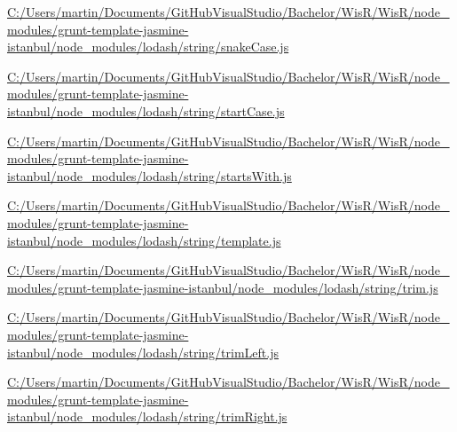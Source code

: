 \begin{DoxyCompactItemize}
\item 
\hyperlink{_c_1_2_users_2martin_2_documents_2_git_hub_visual_studio_2_bachelor_2_wis_r_2_wis_r_2node_moduleecd1498d65801c0d5530f57e7e5652d8}{C\+:/\+Users/martin/\+Documents/\+Git\+Hub\+Visual\+Studio/\+Bachelor/\+Wis\+R/\+Wis\+R/node\+\_\+modules/grunt-\/template-\/jasmine-\/istanbul/node\+\_\+modules/lodash/string/snake\+Case.\+js}
\item 
\hyperlink{_c_1_2_users_2martin_2_documents_2_git_hub_visual_studio_2_bachelor_2_wis_r_2_wis_r_2node_moduleed6e7930574a8e05fc16a488094f4093}{C\+:/\+Users/martin/\+Documents/\+Git\+Hub\+Visual\+Studio/\+Bachelor/\+Wis\+R/\+Wis\+R/node\+\_\+modules/grunt-\/template-\/jasmine-\/istanbul/node\+\_\+modules/lodash/string/start\+Case.\+js}
\item 
\hyperlink{_c_1_2_users_2martin_2_documents_2_git_hub_visual_studio_2_bachelor_2_wis_r_2_wis_r_2node_modulef7b64fa5ac90e24cb7efebb11f6658e1}{C\+:/\+Users/martin/\+Documents/\+Git\+Hub\+Visual\+Studio/\+Bachelor/\+Wis\+R/\+Wis\+R/node\+\_\+modules/grunt-\/template-\/jasmine-\/istanbul/node\+\_\+modules/lodash/string/starts\+With.\+js}
\item 
\hyperlink{_c_1_2_users_2martin_2_documents_2_git_hub_visual_studio_2_bachelor_2_wis_r_2_wis_r_2node_moduleccdd05b6c4baa7b5de77d09f0ab8043a}{C\+:/\+Users/martin/\+Documents/\+Git\+Hub\+Visual\+Studio/\+Bachelor/\+Wis\+R/\+Wis\+R/node\+\_\+modules/grunt-\/template-\/jasmine-\/istanbul/node\+\_\+modules/lodash/string/template.\+js}
\item 
\hyperlink{_c_1_2_users_2martin_2_documents_2_git_hub_visual_studio_2_bachelor_2_wis_r_2_wis_r_2node_modulee63aea90e92167677bdd49bb5c090a82}{C\+:/\+Users/martin/\+Documents/\+Git\+Hub\+Visual\+Studio/\+Bachelor/\+Wis\+R/\+Wis\+R/node\+\_\+modules/grunt-\/template-\/jasmine-\/istanbul/node\+\_\+modules/lodash/string/trim.\+js}
\item 
\hyperlink{_c_1_2_users_2martin_2_documents_2_git_hub_visual_studio_2_bachelor_2_wis_r_2_wis_r_2node_moduleb90a6851e6eb0646cfd6ee318d679b9f}{C\+:/\+Users/martin/\+Documents/\+Git\+Hub\+Visual\+Studio/\+Bachelor/\+Wis\+R/\+Wis\+R/node\+\_\+modules/grunt-\/template-\/jasmine-\/istanbul/node\+\_\+modules/lodash/string/trim\+Left.\+js}
\item 
\hyperlink{_c_1_2_users_2martin_2_documents_2_git_hub_visual_studio_2_bachelor_2_wis_r_2_wis_r_2node_module3e2dcb4badedee82aaa23608c556fded}{C\+:/\+Users/martin/\+Documents/\+Git\+Hub\+Visual\+Studio/\+Bachelor/\+Wis\+R/\+Wis\+R/node\+\_\+modules/grunt-\/template-\/jasmine-\/istanbul/node\+\_\+modules/lodash/string/trim\+Right.\+js}

\end{DoxyCompactItemize}
